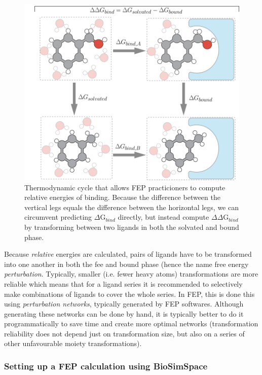 \begin{figure}[htp]
\includegraphics[width=\linewidth]{04_fep/inputs/tut_imgs/therm_cycle.png}
\caption{Thermodynamic cycle that allows FEP practicioners to
compute relative energies of binding. Because the difference between the
vertical legs equals the difference between the horizontal legs, we can
circumvent predicting $\Delta$G$_{bind}$ directly, but instead compute $\Delta\Delta$G$_{bind}$ by
transforming between two ligands in both the solvated and bound phase.}
\label{thermodynamic_cycle_fig}
\end{figure}

Because \emph{relative} energies are calculated, pairs of ligands have to be transformed into one another in both the fee and bound phase (hence the name free energy \emph{perturbation}. Typically, smaller (i.e. fewer heavy atoms) transformations are more reliable which means
that for a ligand series it is recommended to selectively make combinations of
ligands to cover the whole series. In FEP, this is done this using
\emph{perturbation networks}, typically generated by FEP softwares.
Although generating these networks can be done by hand, it is typically
better to do it programmatically to save time and create more optimal networks
(transformation reliability does not depend just on transformation size,
but also on a series of other unfavourable moiety transformations).

\subsubsection{Setting up a FEP calculation using BioSimSpace}


